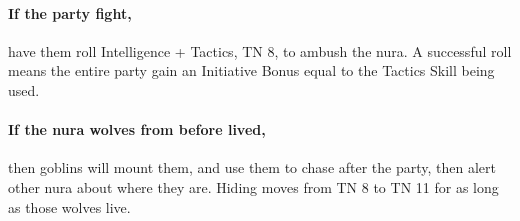 \begin{multicols}{2}
{\paragraph{If the party fight,}
have them roll Intelligence + Tactics, TN 8, to ambush the nura.
A successful roll means the entire party gain an Initiative Bonus equal to the Tactics Skill being used.

\paragraph{If the nura wolves from before lived,}
then goblins will mount them, and use them to chase after the party, then alert other nura about where they are.
Hiding moves from TN 8 to TN 11 for as long as those wolves live.


}

\end{multicols}

